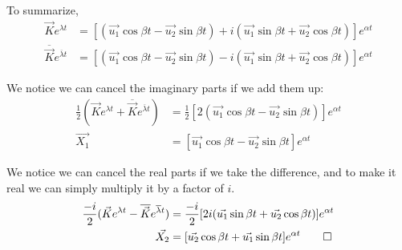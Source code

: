 \documentclass[11pt, oneside]{article}
\theoremstyle{plain}
\theoremstyle{definition}
\begin{document}
To summarize,
\begin{align*}
  \vec{K} e^{\lambda t} &= [(\vec{u_1} \cos{\beta t} - \vec{u_2} \sin{\beta t})
                        + i (\vec{u_1} \sin{\beta t} + \vec{u_2} \cos{\beta t})] e^{\alpha t} \\
\overline{\vec{K}} e^{\overline{\lambda} t}
                        &= [(\vec{u_1} \cos{\beta t} - \vec{u_2} \sin{\beta t})
                        - i (\vec{u_1} \sin{\beta t} + \vec{u_2} \cos{\beta t})] e^{\alpha t}
\end{align*}

We notice we can cancel the imaginary parts if we add them up:
\begin{align*}
  \frac{1}{2}(\vec{K} e^{\lambda t} + \overline{\vec{K}} e^{\overline{\lambda} t}) &= 
  \frac{1}{2}[2(\vec{u_1} \cos{\beta t} - \vec{u_2} \sin{\beta t})]e^{\alpha t} \\
  \vec{X_1} &= [\vec{u_1} \cos{\beta t} - \vec{u_2} \sin{\beta t}] e^{\alpha t}
\end{align*}

We notice we can cancel the real parts if we take the difference, and to make
it real we can simply multiply it by a factor of \( i \).
\begin{align*}
  \frac{-i}{2}(\vec{K} e^{\lambda t} - \overline{\vec{K}} e^{\overline{\lambda} t}) &= 
  \frac{-i}{2}[2i(\vec{u_1} \sin{\beta t} + \vec{u_2} \cos{\beta t})]e^{\alpha t} \\
  \vec{X_2} &= [\vec{u_2} \cos{\beta t} + \vec{u_1} \sin{\beta t}] e^{\alpha t} \qed
\end{align*}

\newpage
\end{document}

